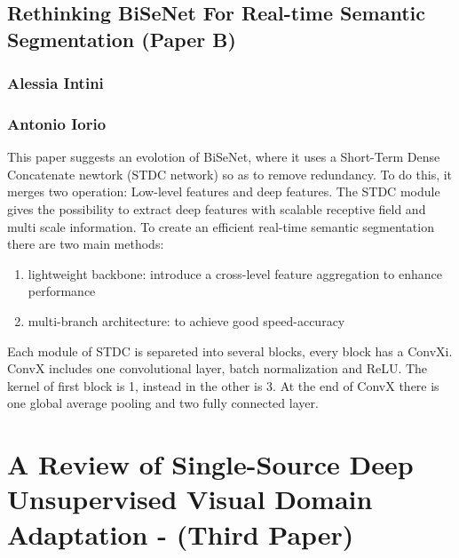 \documentclass{article}
\begin{document}
        \subsection{Rethinking BiSeNet For Real-time Semantic Segmentation (Paper B)}
            \subsubsection{Alessia Intini}

            \subsubsection{Antonio Iorio}
            This paper suggests an evolotion of BiSeNet, where it uses a Short-Term Dense
            Concatenate newtork (STDC network) so as to remove redundancy. To do this, it merges
            two operation: Low-level features and deep features.
            The STDC module gives the possibility to extract deep features with scalable receptive
            field and multi scale information.
            To create an efficient real-time semantic segmentation there are two main methods:
            \begin{enumerate}
                \item lightweight backbone: introduce a cross-level feature aggregation to enhance performance
                \item multi-branch architecture: to achieve good speed-accuracy
            \end{enumerate}
            Each module of STDC is separeted into several blocks, every block has a ConvXi. 
            ConvX includes one convolutional layer, batch normalization and ReLU.
            The kernel of first block is 1, instead in the other is 3.
            At the end of ConvX there is one global average pooling and two fully connected layer.

    \section{A Review of Single-Source Deep Unsupervised Visual Domain Adaptation - (Third Paper)}
    
\end{document}
